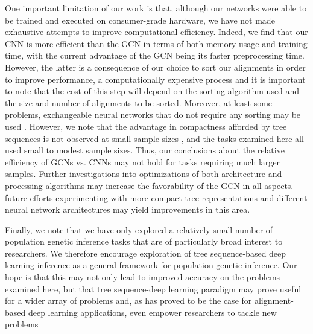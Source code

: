 One important limitation of our work is that, although our networks were able to be trained and executed on consumer-grade hardware, we have not made exhaustive attempts to improve computational efficiency. Indeed, we find that our CNN is more efficient than the GCN in terms of both memory usage and training time, with the current advantage of the GCN being its faster preprocessing time. However, the latter is a consequence of our choice to sort our alignments in order to improve performance, a computationally expensive process \cite{rayIntroUNETIdentifyingIntrogressed2023} and it is important to note that the cost of this step will depend on the sorting algorithm used and the size and number of alignments to be sorted. Moreover, at least some problems, exchangeable neural networks that do not require any sorting may be used \cite{chanLikelihoodFreeInferenceFramework2018}. However, we note that the advantage in compactness afforded by tree sequences is not observed at small sample sizes \cite{kelleherInferringWholegenomeHistories2019}, and the tasks examined here all used small to modest sample sizes. Thus, our conclusions about the relative efficiency of GCNs vs. CNNs may not hold for tasks requiring much larger samples. Further investigations into optimizations of both architecture and processing algorithms may increase the favorability of the GCN in all aspects. future efforts experimenting with more compact tree representations \cite{hallerTreesequenceRecordingSLiM2019,kelleherEfficientPedigreeRecording2018,kelleherInferringWholegenomeHistories2019,mahmoudiBayesianInferenceAncestral2022,ralphEfficientlySummarizingRelationships2020} and different neural network architectures may yield improvements in this area.

Finally, we note that we have only explored a relatively small number of population genetic inference tasks that are of particularly broad interest to researchers. We therefore encourage exploration of tree sequence-based deep learning inference as a general framework for population genetic inference. Our hope is that this may not only lead to improved accuracy on the problems examined here, but that tree sequence-deep learning paradigm may prove useful for a wider array of problems and, as has proved to be the case for alignment-based deep learning applications, even empower researchers to tackle new problems \cite{batteyVisualizingPopulationStructure2021,bookerThisPopulationDoes2023,korfmannDeepLearningPopulation2023a,smithDispersalInferencePopulation2023,whitehouseTimesweeperAccuratelyIdentifying2023,yelmenCreatingArtificialHuman2021}
